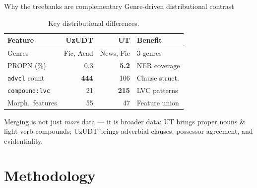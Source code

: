 \documentclass[t,10pt]{beamer}
\newcommand{\best}[1]{\textcolor{edmgreen}{\textbf{#1}}}
\begin{document}
\begin{frame}{Why the treebanks are complementary}%
             {Genre-driven distributional contrast}
  \begin{table}
    \small
    \begin{tabular}{lrrl}
      \textbf{Feature} & \textbf{UzUDT} & \textbf{UT} & \textbf{Benefit}\\
      \toprule
      Genres                  & Fic, Acad & News, Fic & 3 genres \\
      PROPN (\%)              & 0.3 & \best{5.2} & NER coverage \\
      \texttt{advcl} count     & \best{444} & 106 & Clause struct. \\
      \texttt{compound:lvc}    & 21 & \best{215} & LVC patterns \\
      Morph.\ features         & 55 & 47 & Feature union \\
      \bottomrule
    \end{tabular}
    \caption{Key distributional differences.}
  \end{table}
  \footnotesize
  Merging is not just \emph{more} data --- it is \alert{broader} data:
  UT brings proper nouns \& light-verb compounds; UzUDT brings adverbial
  clauses, possessor agreement, and evidentiality.
\end{frame}

\section{Methodology}
\end{document}
